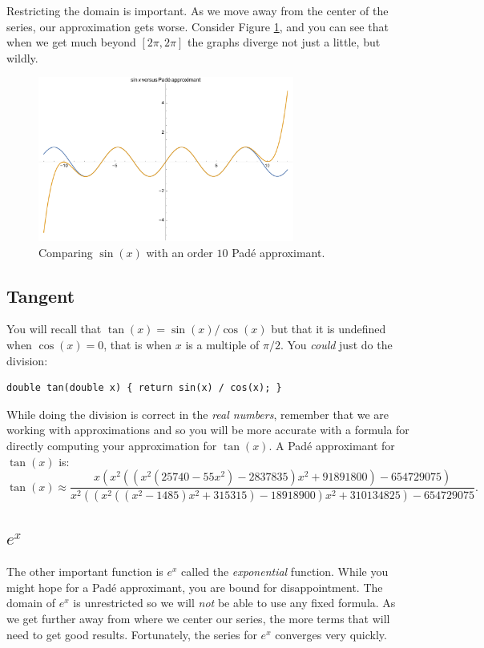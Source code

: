 \documentclass[11pt]{article}
\begin{document}
Restricting the domain is important. As we move away from the center of the series, our approximation gets worse. Consider Figure \ref{pade}, and you can see that when we get much beyond $[2\pi,2\pi]$ the graphs diverge not just a little, but wildly.

\begin{figure}[hbt]
\begin{centering}
\includegraphics[width=0.75\textwidth]{Pade}
\caption{Comparing $\sin(x)$ with an order $10$ Pad\'e approximant.}\label{pade}
\end{centering}
\end{figure}


\subsection{Tangent}
You will recall that $\tan(x) = {\sin(x)} / {\cos(x)}$ but
that it is undefined when $\cos(x) = 0$, that is when $x$ is a
multiple of ${\pi}/{2}$. You \emph{could} just do the division:
\begin{lstlisting}
double tan(double x) { return sin(x) / cos(x); }
\end{lstlisting}

While doing the division is correct in the \emph{real numbers},
remember that we are working with approximations and so you will
be more accurate with a formula for directly computing your approximation
for $\tan(x)$.  A Pad\'e approximant for $\tan(x)$ is:
$$
\tan(x)\approx
\frac{x \left(x^2 \left(\left(x^2 \left(25740-55 x^2\right)-2837835\right)
   x^2+91891800\right)-654729075\right)}{x^2 \left(\left(x^2 \left(\left(x^2-1485\right)
   x^2+315315\right)-18918900\right) x^2+310134825\right)-654729075}.
	$$

\subsection{\Large $e^x$}
The other important function is $e^x$ called the \emph{exponential}
function.  While you might hope for a Pad\'e approximant, you are
bound for disappointment.  The domain of $e^x$ is unrestricted so
we will \emph{not} be able to use any fixed formula.  As we get further
away from where we center our series, the more terms that will need
to get good results. Fortunately, the series for $e^x$ converges
very quickly.
\end{document}

